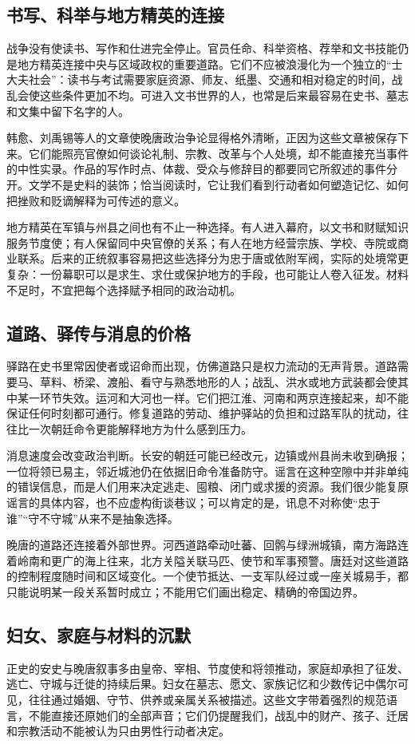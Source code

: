 \subsection{书写、科举与地方精英的连接}
战争没有使读书、写作和仕进完全停止。官员任命、科举资格、荐举和文书技能仍是地方精英连接中央与区域政权的重要道路。它们不应被浪漫化为一个独立的“士大夫社会”：读书与考试需要家庭资源、师友、纸墨、交通和相对稳定的时间，战乱会使这些条件更加不均。可进入文书世界的人，也常是后来最容易在史书、墓志和文集中留下名字的人。

韩愈、刘禹锡等人的文章使晚唐政治争论显得格外清晰，正因为这些文章被保存下来。它们能照亮官僚如何谈论礼制、宗教、改革与个人处境，却不能直接充当事件的中性实录。作品的写作时点、体裁、受众与修辞目的都要同它所叙述的事件分开。文学不是史料的装饰；恰当阅读时，它让我们看到行动者如何塑造记忆、如何把挫败和贬谪解释为可传述的意义。

地方精英在军镇与州县之间也有不止一种选择。有人进入幕府，以文书和财赋知识服务节度使；有人保留同中央官僚的关系；有人在地方经营宗族、学校、寺院或商业联系。后来的正统叙事容易把这些选择分为忠于唐或依附军阀，实际的处境常更复杂：一份幕职可以是求生、求仕或保护地方的手段，也可能让人卷入征发。材料不足时，不宜把每个选择赋予相同的政治动机。

\subsection{道路、驿传与消息的价格}
驿路在史书里常因使者或诏命而出现，仿佛道路只是权力流动的无声背景。道路需要马、草料、桥梁、渡船、看守与熟悉地形的人；战乱、洪水或地方武装都会使其中某一环节失效。运河和大河也一样。它们把江淮、河南和两京连接起来，却不能保证任何时刻都可通行。修复道路的劳动、维护驿站的负担和过路军队的扰动，往往比一次朝廷命令更能解释地方为什么感到压力。

消息速度会改变政治判断。长安的朝廷可能已经改元，边镇或州县尚未收到确报；一位将领已易主，邻近城池仍在依据旧命令准备防守。谣言在这种空隙中并非单纯的错误信息，而是人们用来决定逃走、囤粮、闭门或求援的资源。我们很少能复原谣言的具体内容，也不应虚构街谈巷议；可以肯定的是，讯息不对称使“忠于谁”“守不守城”从来不是抽象选择。

晚唐的道路还连接着外部世界。河西道路牵动吐蕃、回鹘与绿洲城镇，南方海路连着岭南和更广的海上往来，北方关隘关联马匹、使节和军事预警。唐廷对这些道路的控制程度随时间和区域变化。一个使节抵达、一支军队经过或一座关城易手，都只能说明某一段关系暂时成立；不能用它们画出稳定、精确的帝国边界。

\subsection{妇女、家庭与材料的沉默}
正史的安史与晚唐叙事多由皇帝、宰相、节度使和将领推动，家庭却承担了征发、逃亡、守城与迁徙的持续后果。妇女在墓志、愿文、家族记忆和少数传记中偶尔可见，往往通过婚姻、守节、供养或亲属关系被描述。这些文字带着强烈的规范语言，不能直接还原她们的全部声音；它们仍提醒我们，战乱中的财产、孩子、迁居和宗教活动不能被认为只由男性行动者决定。

